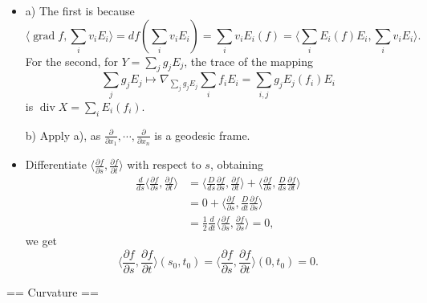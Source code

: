\begin{itemize}
    \item[8.] a) The first is because
    \[\langle \operatorname{grad}f,\sum_i v_iE_i \rangle
    =df(\sum_i v_iE_i)=\sum_i v_iE_i(f)
    =\langle \sum_i E_i(f)E_i,\sum_i v_iE_i \rangle.\]
    For the second, for $Y=\sum\limits_j g_jE_j$, the trace of the mapping
    \[\sum_j g_jE_j \mapsto \nabla_{\sum\limits_j g_jE_j}\sum_i f_iE_i
    =\sum_{i,j} g_jE_j(f_i)E_i\]
    is $\operatorname{div}X=\sum\limits_i E_i(f_i)$.

    b) Apply a), as $\frac{\partial}{\partial x_1},\cdots,
    \frac{\partial}{\partial x_n}$ is a geodesic frame.

    \item[10.] Differentiate $\big\langle\frac{\partial f}{\partial s},
    \frac{\partial f}{\partial t}\big\rangle$ with respect to $s$, obtaining
    \begin{align*}
        \frac{d}{ds}\bigg\langle\frac{\partial f}{\partial s},
        \frac{\partial f}{\partial t}\bigg\rangle
        &=\bigg\langle\frac{D}{ds}\frac{\partial f}{\partial s},
        \frac{\partial f}{\partial t}\bigg\rangle+
        \bigg\langle\frac{\partial f}{\partial s},
        \frac{D}{ds}\frac{\partial f}{\partial t}\bigg\rangle\\
        &=0+\bigg\langle\frac{\partial f}{\partial s},
        \frac{D}{dt}\frac{\partial f}{\partial s}\bigg\rangle\\
        &=\frac{1}{2}\frac{d}{dt}\bigg\langle\frac{\partial f}{\partial s},
        \frac{\partial f}{\partial s}\bigg\rangle=0,
    \end{align*}
    we get
    \[\bigg\langle\frac{\partial f}{\partial s},
    \frac{\partial f}{\partial t}\bigg\rangle(s_0,t_0)
    =\bigg\langle\frac{\partial f}{\partial s},
    \frac{\partial f}{\partial t}\bigg\rangle(0,t_0)=0.\]
\end{itemize}

== Curvature ==

